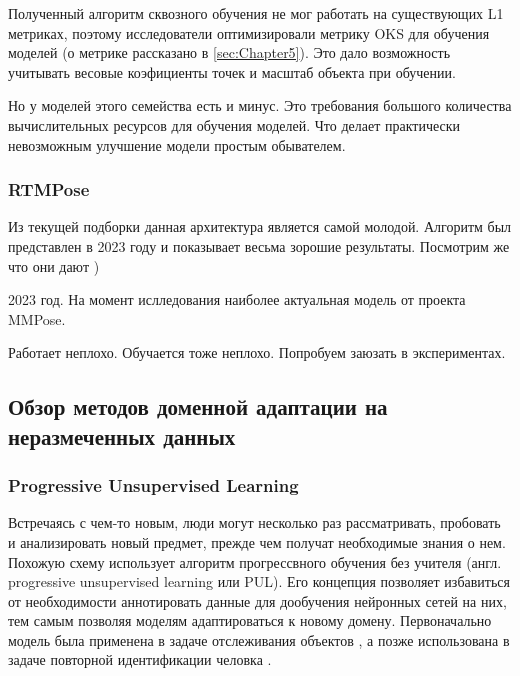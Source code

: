 Полученный алгоритм сквозного обучения не мог работать на существующих L1 метриках, поэтому исследователи оптимизировали метрику OKS для обучения моделей (о метрике рассказано в \autoref{sec:Chapter5}). Это дало возможность учитывать весовые коэфициенты точек и масштаб объекта при обучении.

Но у моделей этого семейства есть и минус. Это требования большого количества вычислительных ресурсов для обучения моделей. Что делает практически невозможным улучшение модели простым обывателем. 

\subsubsection*{RTMPose}

Из текущей подборки данная архитектура является самой молодой. Алгоритм был представлен в 2023 году и показывает весьма зорошие результаты. Посмотрим же что они дают )

2023 год. На момент ислледования наиболее актуальная модель от проекта MMPose.

Работает неплохо. Обучается тоже неплохо. Попробуем заюзать в экспериментах.


\subsection{Обзор методов доменной адаптации на неразмеченных данных}
\label{sec:Chapter4_DA}


\subsubsection*{Progressive Unsupervised Learning}

Встречаясь с чем-то новым, люди могут несколько раз рассматривать, пробовать и анализировать новый предмет, прежде чем получат необходимые знания о нем. Похожую схему использует алгоритм прогрессвного обучения без учителя (англ. progressive unsupervised learning или PUL). Его концепция позволяет избавиться от необходимости аннотировать данные для дообучения нейронных сетей на них, тем самым позволяя моделям адаптироваться к новому домену. Первоначально модель была применена в задаче отслеживания объектов \cite{pul}, а позже использована в задаче повторной идентификации человка \cite{pul_person}.


